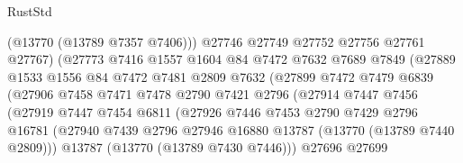 \begin{lexlean}{RustStd}
\begin{coremodule}
                                (@13770 (@13789 @7357 @7406)))
                              @27746
                              @27749
                              @27752
                              @27756
                              @27761
                              @27767)
                            (@27773
                              @7416
                              @1557
                              @1604
                              @84
                              @7472
                              @7632
                              @7689
                              @7849
                              (@27889
                                @1533
                                @1556
                                @84
                                @7472
                                @7481
                                @2809
                                @7632
                                (@27899
                                  @7472
                                  @7479
                                  @6839
                                  (@27906
                                    @7458
                                    @7471
                                    @7478
                                    @2790
                                    @7421
                                    @2796
                                    (@27914
                                      @7447
                                      @7456
                                      (@27919
                                        @7447
                                        @7454
                                        @6811
                                        (@27926
                                          @7446
                                          @7453
                                          @2790
                                          @7429
                                          @2796
                                          @16781
                                          (@27940
                                            @7439
                                            @2796
                                            @27946
                                            @16880
                                            @13787
                                            (@13770 (@13789 @7440 @2809)))
                                          @13787
                                          (@13770 (@13789 @7430 @7446)))
                                        @27696
                                        @27699

\end{coremodule}
\end{lexlean}
